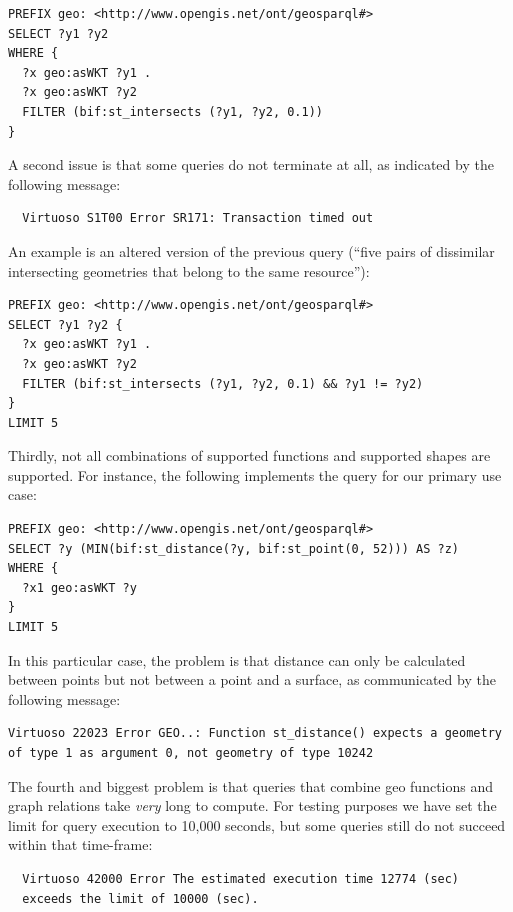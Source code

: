 \documentclass[a4paper]{scrartcl}
\begin{document}
\begin{verbatim}
PREFIX geo: <http://www.opengis.net/ont/geosparql#>
SELECT ?y1 ?y2
WHERE {
  ?x geo:asWKT ?y1 .
  ?x geo:asWKT ?y2
  FILTER (bif:st_intersects (?y1, ?y2, 0.1))
}
\end{verbatim}

A second issue is that some queries do not terminate at all, as
indicated by the following message:

\begin{verbatim}
  Virtuoso S1T00 Error SR171: Transaction timed out
\end{verbatim}

An example is an altered version of the previous query (``five pairs
of dissimilar intersecting geometries that belong to the same
resource''):

\begin{verbatim}
PREFIX geo: <http://www.opengis.net/ont/geosparql#>
SELECT ?y1 ?y2 {
  ?x geo:asWKT ?y1 .
  ?x geo:asWKT ?y2
  FILTER (bif:st_intersects (?y1, ?y2, 0.1) && ?y1 != ?y2)
}
LIMIT 5
\end{verbatim}

Thirdly, not all combinations of supported functions and supported
shapes are supported.  For instance, the following implements the
query for our primary use case:

\begin{verbatim}
PREFIX geo: <http://www.opengis.net/ont/geosparql#>
SELECT ?y (MIN(bif:st_distance(?y, bif:st_point(0, 52))) AS ?z)
WHERE {
  ?x1 geo:asWKT ?y
}
LIMIT 5
\end{verbatim}

In this particular case, the problem is that distance can only be
calculated between points but not between a point and a surface, as
communicated by the following message:

\begin{verbatim}
Virtuoso 22023 Error GEO..: Function st_distance() expects a geometry
of type 1 as argument 0, not geometry of type 10242
\end{verbatim}

The fourth and biggest problem is that queries that combine geo
functions and graph relations take \emph{very} long to compute.  For
testing purposes we have set the limit for query execution to 10,000
seconds, but some queries still do not succeed within that time-frame:

\begin{verbatim}
  Virtuoso 42000 Error The estimated execution time 12774 (sec)
  exceeds the limit of 10000 (sec).
\end{verbatim}
\end{document}
